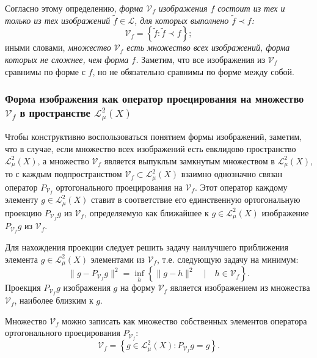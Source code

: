 Согласно этому определению, \emph{форма $\mathcal{V}_f$ изображения $f$ состоит из тех и только из тех изображений $\tilde{f} \in \mathcal{L}$, для которых выполнено $\tilde{f} \prec f$:}
\begin{equation*}
    \mathcal{V}_f = \left\{\tilde{f}: \tilde{f} \prec f\right\};
\end{equation*}
иными словами, \emph{множество $\mathcal{V}_f$ есть множество всех изображений, форма которых не сложнее, чем форма $f$.} Заметим, что все изображения из $\mathcal{V}_f$ сравнимы по форме с $f$, но не обязательно сравнимы по форме между собой.

%
%

\subsubsection{Форма изображения как оператор проецирования на множество $\mathcal{V}_f$ в пространстве $\mathcal{L}_{\mu}^2(X)$}\label{label}


Чтобы конструктивно воспользоваться понятием формы изображений, заметим, что в случае, если множество всех
изображений есть евклидово пространство $\mathcal{L}_{\mu}^2(X)$, а
множество $\mathcal{V}_f$ является выпуклым замкнутым множеством в $\mathcal{L}_{\mu}^2(X)$, то с каждым подпространством $\mathcal{V}_f \subset \mathcal{L}_{\mu}^2(X)$ взаимно однозначно связан оператор $P_{\mathcal{V}_f}$
ортогонального проецирования на $\mathcal{V}_f$.
Этот оператор каждому элементу $g \in \mathcal{L}_{\mu}^2(X)$ ставит в соответствие его единственную ортогональную проекцию $P_{\mathcal{V}_f}g$ из $\mathcal{V}_f$, определяемую как ближайшее к $g \in \mathcal{L}_{\mu}^2(X)$ изображение $P_{\mathcal{V}_f}g$ из $\mathcal{V}_f$.


Для нахождения проекции следует решить задачу наилучшего приближения элемента $g \in \mathcal{L}_{\mu}^2(X)$
элементами из $\mathcal{V}_f$, т.е. следующую задачу на минимум:
\begin{equation*}
\|g - P_{\mathcal{V}_f}g\|^2 = \inf_{h}\left\{\|g-h\|^2\quad|\quad h \in \mathcal{V}_f\right\}.
\end{equation*}
Проекция $P_{\mathcal{V}_f}g$ изображения $g$ на форму $\mathcal{V}_f$ является изображением из множества $\mathcal{V}_f$, наиболее близким к $g$.


Множество $\mathcal{V}_f$ можно записать как множество собственных элементов оператора ортогонального проецирования $P_{\mathcal{V}_f}$:
\begin{equation}\label{eq:vfdef}
\mathcal{V}_f = \left\{g \in \mathcal{L}_{\mu}^2(X): P_{\mathcal{V}_f}g = g \right\}.
\end{equation}

